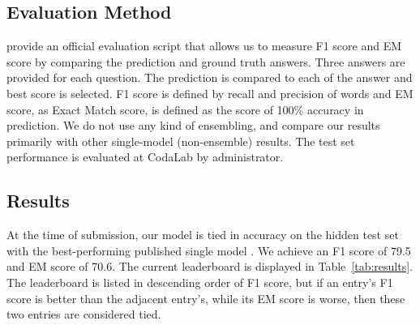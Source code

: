 \documentclass[11pt,letterpaper]{article}
\begin{document}
\subsection{Evaluation Method}
 \citet{Rajpurkar:2016vf} provide an official evaluation script that allows us to measure F1 score and EM score by comparing the prediction and ground truth answers. Three answers are provided for each question. The prediction is compared to each of the answer and best score is selected. F1 score is defined by recall and precision of words and EM score, as Exact Match score, is defined as the score of 100\% accuracy in prediction. We do not use any kind of ensembling, and compare our results primarily with other single-model (non-ensemble) results. The test set performance is evaluated at CodaLab by administrator.

\subsection{Results}
At the time of submission, our model is tied in accuracy on the hidden test set with the best-performing published single model \citep{Zhang:2017wl}. We achieve an F1 score of 79.5 and EM score of 70.6. The current leaderboard is displayed in Table~\ref{tab:results}. The leaderboard is listed in descending order of F1 score, but if an entry's F1 score is better than the adjacent entry's, while its EM score is worse, then these two entries are considered tied.
\end{document}
